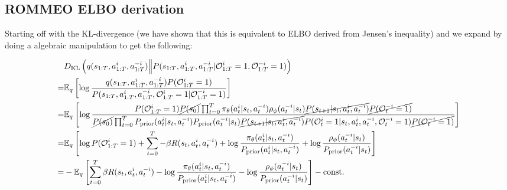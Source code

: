 \subsection{ROMMEO ELBO derivation}
\label{appx:chap3-ROMMEO-ELBO}
Starting off with the KL-divergence (we have shown that this is equivalent to ELBO derived from Jensen's inequality) and we expand by doing a algebraic manipulation to get the following:

\begin{equation*}
    \begin{aligned}
        &D_{\mathrm{KL}}\left( q(s_{1:T}, a_{1:T}^i, a^{-i}_{1:T}) \Big\| P(s_{1:T}, a^i_{1:T}, a^{-i}_{1:T}|\mathcal{O}^i_{1:T} = 1,  \mathcal{O}^{-i}_{1:T} = 1)  \right) \\
        =& \mathbb{E}_{q}\left[ \log \frac{q(s_{1:T}, a_{1:T}^i, a^{-i}_{1:T}) P(\mathcal{O}^i_{1:T} = 1)}{P(s_{1:T}, a^i_{1:T}, a^{-i}_{1:T}, \mathcal{O}^i_{1:T} = 1 | \mathcal{O}^{-i}_{1:T} = 1)} \right] \\
        =& \mathbb{E}_{q}\left[ \log \frac{P(\mathcal{O}^i_{1:T} = 1)\cancel{P(s_0)} \prod^T_{t=0} \pi_{\theta}(a^i_t | s_t, a^{-i}_t) \rho_{\phi}(a^{-i}_t | s_t) \cancel{P(s_{t+1} | s_t, a^i_t, a^{-i}_t)} \cancel{P(\mathcal{O}^{-i}_t = 1)}}{\cancel{P(s_0)} \prod^T_{t=0} P_{\text{prior}}(a^i_t | s_t, a^{-i}_t) P_{\text{prior}}(a^{-i}_t | s_t) \cancel{P(s_{t+1} | s_t, a^i_t, a^{-i}_t)} P(\mathcal{O}^i_t = 1 | s_t, a^i_t, a^{-i}_t, \mathcal{O}^{-i}_t = 1)\cancel{P(\mathcal{O}^{-i}_t = 1)}}  \right] \\
        =& \mathbb{E}_{q}\left[  \log P(\mathcal{O}^i_{1:T} = 1) + \sum^T_{t=0} - \beta R(s_t, a^i_t, a^{-i}_t)  + \log \frac{\pi_{\theta}(a^i_t | s_t, a^{-i}_t)}{P_{\text{prior}}(a^i_t | s_t, a^{-i}_t) } + \log \frac{\rho_{\phi}(a^{-i}_t | s_t)}{P_{\text{prior}}(a^{-i}_t | s_t)} \right] \\
        =& - \mathbb{E}_{q}\left[  \sum^T_{t=0} \beta R(s_t, a^i_t, a^{-i}_t)  - \log \frac{\pi_{\theta}(a^i_t | s_t, a^{-i}_t)}{P_{\text{prior}}(a^i_t | s_t, a^{-i}_t) } - \log \frac{\rho_{\phi}(a^{-i}_t | s_t)}{P_{\text{prior}}(a^{-i}_t | s_t)} \right] - \text{const.} \\
    \end{aligned}
\end{equation*}


